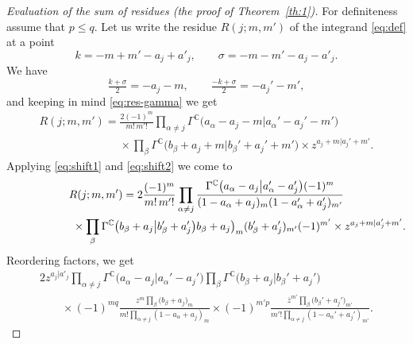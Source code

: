 \documentclass[pdftex]{sigma}
\numberwithin{equation}{section}
\def\ov{\overline}
\def\C {{\mathbb C }}
\def\le{\leqslant}
\begin{document}
\begin{proof}[Evaluation of the sum of residues (the proof of Theorem~\ref{th:1})]
For definiteness assume that $p\le q$.
Let us write the residue $R(j;m,m')$ of the integrand \eqref{eq:def}
at a point
\[
k= -m+m'-a_j+a'_j,\qquad \sigma=-m-m'-a_j-a'_j.
\]
We have
\[
\tfrac{k+\sigma}{2}=-a_j-m,\qquad \tfrac{-k+\sigma}{2}=-a_j'-m',
\]
and
keeping in mind \eqref{eq:res-gamma} we get
\begin{gather*}
R(j;m,m')=\frac{2(-1)^m}{m!\,m'!}
 \prod_{\alpha\ne j}
\Gamma^\C\big(a_\alpha-a_j-m\big|a_\alpha'-a_j'-m'\big)\\
\phantom{R(j;m,m')=}{} \times
\prod_{\beta} \Gamma^\C\big(b_\beta+a_j+m\big|b_\beta'+a_j'+m'\big)
\times z^{a_j+m|a_j'+m'}.
\end{gather*}
Applying \eqref{eq:shift1} and \eqref{eq:shift2} we come to
\begin{gather*}
R(j;m,m')=2 \frac{(-1)^m}{m!\,m'!}
\prod_{\alpha\ne j} \frac{\Gamma^\C\big(
a_\alpha-a_j\big|a_\alpha'-a_j'\big)(-1)^{m}}
{(1-a_\alpha+a_j)_m(1-a_\alpha'+a_j')_{m'}} \\
\hphantom{R(j;m,m')=}{} \times
\prod_{\beta} \Gamma^\C\big(b_\beta+a_j\big|b_\beta'+a_j'\big)
b_\beta+a_j\big)_m(b_\beta'+a_j')_{m'} (-1)^{m'}
\times z^{a_j+m|a_j'+m'}.
\end{gather*}
Reordering factors, we get
\begin{gather*}
2 z^{a_j|a'_j}
\prod_{\alpha\ne j} \Gamma^\C\big(a_\alpha-a_j\big|a_\alpha'-a_j'\big)
\prod_{\beta}
\Gamma^\C\big(b_\beta+a_j\big|b_\beta'+a_j'\big) \\
\qquad{}\times
(-1)^{mq} \frac{z^m \prod\limits_{\beta}(b_\beta+a_j\big)_{m}}
{m!\prod\limits_{\alpha\ne j} (1-a_\alpha+a_j)_{m}}
 \times
(-1)^{m'p} \frac{\ov z^{m'} \prod\limits_{\beta}(b_\beta'+a_j'\big)_{m'}}
{m'!\prod\limits_{\alpha\ne j} (1-a_\alpha'+a_j')_{m'}}.
\end{gather*}


\end{proof}
\end{document}
